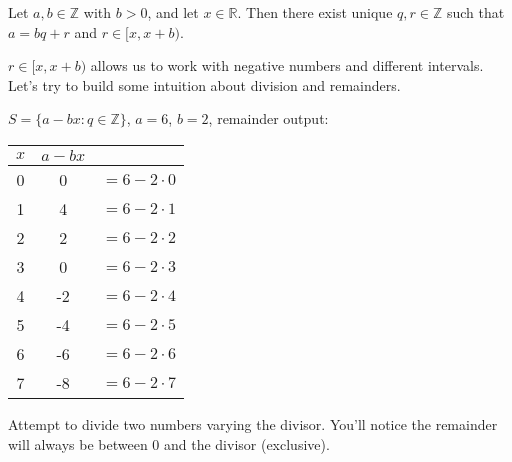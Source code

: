 \newpage

\begin{theo}

    Let $a, b \in \mathbb{Z}$ with $b > 0$, and let $x \in \mathbb{R}$. Then there exist unique $q, r \in \mathbb{Z}$ such that $a = bq + r$ and $r \in [x, x + b)$.
\end{theo}

\noindent
$r \in [x, x + b)$ allows us to work with negative numbers and different intervals. Let's
try to build some intuition about division and remainders.

\begin{center}
    $S=\{a-bx:q\in\mathbb{Z}\}$, $a=6$, $b=2$, remainder output:
\end{center}
\begin{center}
    \begin{tabular}{c|cc}
        $x$ & $a-bx$                \\
        \hline
        0   & 0      & $=6-2\cdot0$ \\
        1   & 4      & $=6-2\cdot1$ \\
        2   & 2      & $=6-2\cdot2$ \\
        3   & 0      & $=6-2\cdot3$ \\
        \hline
        4   & -2     & $=6-2\cdot4$ \\
        5   & -4     & $=6-2\cdot5$ \\
        6   & -6     & $=6-2\cdot6$ \\
        7   & -8     & $=6-2\cdot7$ \\
    \end{tabular}
\end{center}

\noindent
Attempt to divide two numbers varying the divisor.
You'll notice the remainder will always be between 0 and the divisor (exclusive).



